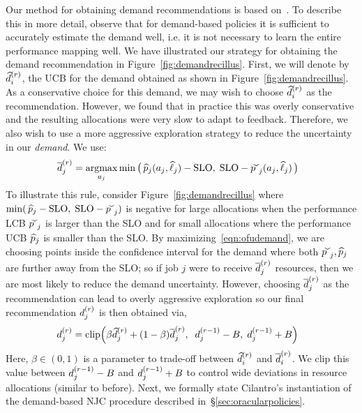 Our method for obtaining demand recommendations is based on~\cite{kandasamy20online}.
To describe this in more detail, observe that
for demand-based policies it is sufficient to accurately estimate the demand well, i.e.
it is not necessary to learn the entire performance mapping well.
We have illustrated our strategy for obtaining the demand
recommendation in Figure~\ref{fig:demandrecillus}.
First, we will denote by $\widehat{d}^{(r)}_{i}$,
the UCB for the demand obtained as shown in Figure~\ref{fig:demandrecillus}.
As a conservative choice for this demand, we may wish to choose $\widehat{d}^{(r)}_{i}$ as the recommendation.
However, we found that in practice this
 was overly conservative  and the resulting allocations
were very slow to adapt to feedback.
Therefore, we also wish to use a more aggressive exploration strategy to reduce the uncertainty
in our \emph{demand}.
We use:
\vspace{-0.05in}
\begin{align}
\hspace{-0.1in}
\dembarjr = \argmax_{\allocj} \min\big(\,\payoffhatj(\allocj, \volhatj) - \textrm{SLO},\;
\textrm{SLO} - \payoffcheckj(\allocj, \volhatj)\,\big)
\label{eqn:ofudemand}
\end{align}
% 
To illustrate this rule, consider Figure~\ref{fig:demandrecillus} where
$\min(\,\payoffhatj - \textrm{SLO},\; \textrm{SLO} - \payoffcheckj)$
is negative for large allocations
when the performance LCB $\payoffcheckj$ is larger than the SLO and for small allocations where
the performance UCB $\widehat{p}_{j}$ is smaller than the SLO.
By maximizing~\eqref{eqn:ofudemand}, we are choosing points inside the confidence interval
for the demand where both  $\payoffcheckj,\payoffhatj$ are further away from the SLO;
so if job $j$ were to receive 
$\overline{d}^{(r)}_{j}$ resources, then we are most likely to reduce the demand uncertainty.
However,
choosing $\overline{d}^{(r)}_{j}$ as the recommendation can lead to overly aggressive exploration so
our final recommendation $d_{j}^{(r)}$ is then obtained via,
\begin{align}
\hspace{-0.10in}
\demj^{(r)} = {\rm clip}\Big( \beta\demhatjr + (1-\beta)\dembarjr, \;\;
                \demj^{(r-1)} - B, \; \demj^{(r-1)} + B\Big)
\label{eqn:demrec}
\end{align}
Here, $\beta\in(0,1)$ is a parameter to trade-off between $\widehat{d}^{(r)}_{i}$ and $\overline{d}^{(r)}_{i}$.
We clip this value between
$d_{j}^{(r-1)} - B$ and $d_{j}^{(r-1)} + B$
to control wide deviations in
resource allocations (similar to before).
% 
Next, we formally state Cilantro's instantiation of the
demand-based NJC procedure described in~\S\ref{sec:oracularpolicies}.


